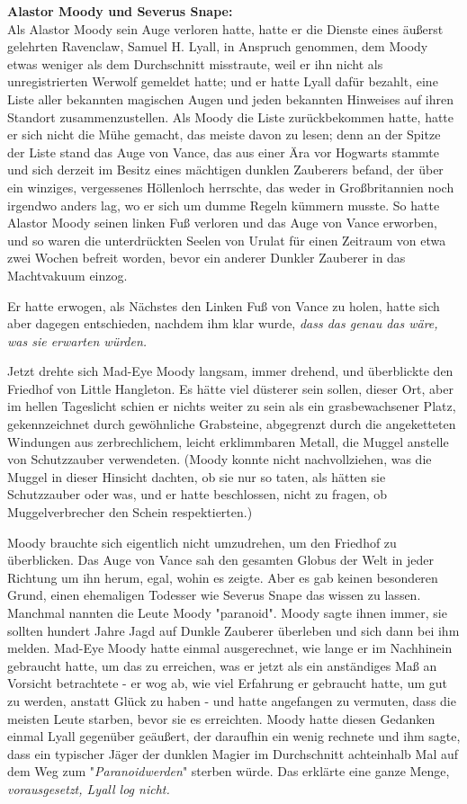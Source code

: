 {\textbf{Alastor Moody und Severus Snape:}\\ Als Alastor Moody sein Auge verloren hatte, hatte er die Dienste eines äußerst gelehrten Ravenclaw, Samuel H. Lyall, in Anspruch genommen, dem Moody etwas weniger als dem Durchschnitt misstraute, weil er ihn nicht als unregistrierten Werwolf gemeldet hatte; und er hatte Lyall dafür bezahlt, eine Liste aller bekannten magischen Augen und jeden bekannten Hinweises auf ihren Standort zusammenzustellen. Als Moody die Liste zurückbekommen hatte, hatte er sich nicht die Mühe gemacht, das meiste davon zu lesen; denn an der Spitze der Liste stand das Auge von Vance, das aus einer Ära vor Hogwarts stammte und sich derzeit im Besitz eines mächtigen dunklen Zauberers befand, der über ein winziges, vergessenes Höllenloch herrschte, das weder in Großbritannien noch irgendwo anders lag, wo er sich um dumme Regeln kümmern musste. So hatte Alastor Moody seinen linken Fuß verloren und das Auge von Vance erworben, und so waren die unterdrückten Seelen von Urulat für einen Zeitraum von etwa zwei Wochen befreit worden, bevor ein anderer Dunkler Zauberer in das Machtvakuum einzog.

Er hatte erwogen, als Nächstes den Linken Fuß von Vance zu holen, hatte sich aber dagegen entschieden, nachdem ihm klar wurde, \emph{dass das genau das wäre, was sie erwarten würden.}

Jetzt drehte sich Mad-Eye Moody langsam, immer drehend, und überblickte den Friedhof von Little Hangleton. Es hätte viel düsterer sein sollen, dieser Ort, aber im hellen Tageslicht schien er nichts weiter zu sein als ein grasbewachsener Platz, gekennzeichnet durch gewöhnliche Grabsteine, abgegrenzt durch die angeketteten Windungen aus zerbrechlichem, leicht erklimmbaren Metall, die Muggel anstelle von Schutzzauber verwendeten. (Moody konnte nicht nachvollziehen, was die Muggel in dieser Hinsicht dachten, ob sie nur so taten, als hätten sie Schutzzauber oder was, und er hatte beschlossen, nicht zu fragen, ob Muggelverbrecher den Schein respektierten.)

Moody brauchte sich eigentlich nicht umzudrehen, um den Friedhof zu überblicken. Das Auge von Vance sah den gesamten Globus der Welt in jeder Richtung um ihn herum, egal, wohin es zeigte. Aber es gab keinen besonderen Grund, einen ehemaligen Todesser wie Severus Snape das wissen zu lassen. Manchmal nannten die Leute Moody "paranoid". Moody sagte ihnen immer, sie sollten hundert Jahre Jagd auf Dunkle Zauberer überleben und sich dann bei ihm melden. Mad-Eye Moody hatte einmal ausgerechnet, wie lange er im Nachhinein gebraucht hatte, um das zu erreichen, was er jetzt als ein anständiges Maß an Vorsicht betrachtete - er wog ab, wie viel Erfahrung er gebraucht hatte, um gut zu werden, anstatt Glück zu haben - und hatte angefangen zu vermuten, dass die meisten Leute starben, bevor sie es erreichten. Moody hatte diesen Gedanken einmal Lyall gegenüber geäußert, der daraufhin ein wenig rechnete und ihm sagte, dass ein typischer Jäger der dunklen Magier im Durchschnitt achteinhalb Mal auf dem Weg zum "\emph{Paranoidwerden}" sterben würde. Das erklärte eine ganze Menge, \emph{vorausgesetzt, Lyall log nicht.}

}
